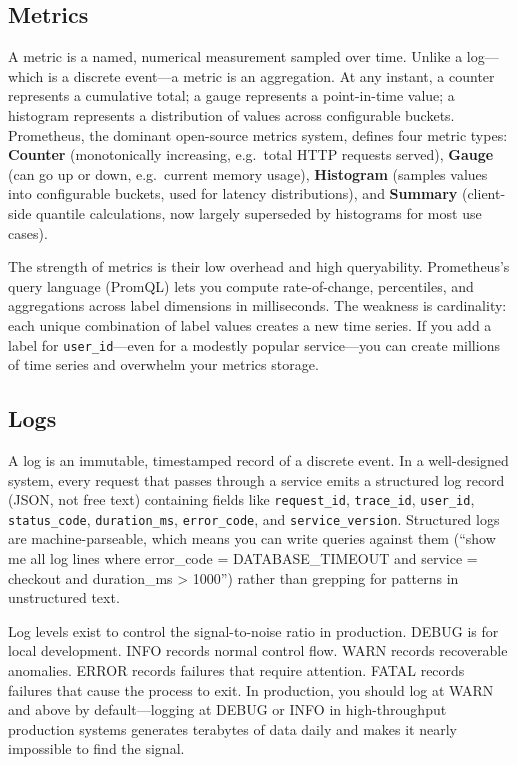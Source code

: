 \documentclass[11pt,a4paper]{article}
\begin{document}
\subsection{Metrics}

A metric is a named, numerical measurement sampled over time. Unlike a log---which is a discrete event---a metric is an aggregation. At any instant, a counter represents a cumulative total; a gauge represents a point-in-time value; a histogram represents a distribution of values across configurable buckets. Prometheus, the dominant open-source metrics system, defines four metric types: \textbf{Counter} (monotonically increasing, e.g.\ total HTTP requests served), \textbf{Gauge} (can go up or down, e.g.\ current memory usage), \textbf{Histogram} (samples values into configurable buckets, used for latency distributions), and \textbf{Summary} (client-side quantile calculations, now largely superseded by histograms for most use cases).

The strength of metrics is their low overhead and high queryability. Prometheus's query language (PromQL) lets you compute rate-of-change, percentiles, and aggregations across label dimensions in milliseconds. The weakness is cardinality: each unique combination of label values creates a new time series. If you add a label for \texttt{user\_id}---even for a modestly popular service---you can create millions of time series and overwhelm your metrics storage.

\subsection{Logs}

A log is an immutable, timestamped record of a discrete event. In a well-designed system, every request that passes through a service emits a structured log record (JSON, not free text) containing fields like \texttt{request\_id}, \texttt{trace\_id}, \texttt{user\_id}, \texttt{status\_code}, \texttt{duration\_ms}, \texttt{error\_code}, and \texttt{service\_version}. Structured logs are machine-parseable, which means you can write queries against them (``show me all log lines where error\_code = DATABASE\_TIMEOUT and service = checkout and duration\_ms > 1000'') rather than grepping for patterns in unstructured text.

Log levels exist to control the signal-to-noise ratio in production. DEBUG is for local development. INFO records normal control flow. WARN records recoverable anomalies. ERROR records failures that require attention. FATAL records failures that cause the process to exit. In production, you should log at WARN and above by default---logging at DEBUG or INFO in high-throughput production systems generates terabytes of data daily and makes it nearly impossible to find the signal.
\end{document}
